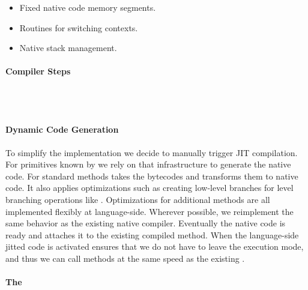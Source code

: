 \begin{itemize}[noitemsep]
	\item Fixed native code memory segments.
	\item Routines for switching contexts.
	\item Native stack management.
\end{itemize}


\paragraph{\NBJ Compiler Steps}
 \\
 \\


\paragraph{Dynamic Code Generation}
To simplify the implementation we decide to manually trigger JIT compilation.
For primitives known by \WF we rely on that infrastructure to generate the native code.
For standard methods \NBJ takes the bytecodes and transforms them to native code.
It also applies optimizations such as creating low-level branches for \ST level branching operations like .
Optimizations for additional methods are all implemented flexibly at language-side.
Wherever possible, we reimplement the same behavior as the existing native \JIT compiler.
Eventually the native code is ready and \B attaches it to the existing compiled method.
When the language-side jitted code is activated \B ensures that we do not have to leave the \JIT execution mode, and thus we can call methods at the same speed as the existing \JIT.


\paragraph{The \Cog \JIT}
\\
\\
\\
\\

